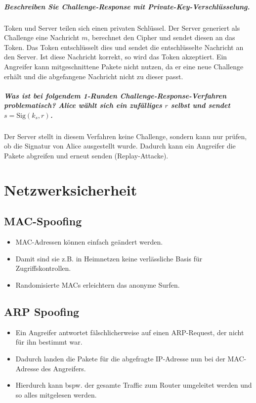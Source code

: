 \documentclass[a4paper, 11pt, accentcolor = tud3b]{tudreport}
\newcommand{\Sig}{\ensuremath{\textrm{Sig}}}
\begin{document}
			\paragraph{Beschreiben Sie Challenge-Response mit Private-Key-Verschlüsselung.}
			Token und Server teilen sich einen privaten Schlüssel. Der Server generiert als Challenge eine Nachricht \(m\), berechnet den Cipher und sendet diesen an das Token. Das Token entschlüsselt dies und sendet die entschlüsselte Nachricht an den Server. Ist diese Nachricht korrekt, so wird das Token akzeptiert. Ein Angreifer kann mitgeschnittene Pakete nicht nutzen, da er eine neue Challenge erhält und die abgefangene Nachricht nicht zu dieser passt.
			
			\paragraph{Was ist bei folgendem 1-Runden Challenge-Response-Verfahren problematisch? Alice wählt sich ein zufälliges \(r\) selbst und sendet \(s = \Sig(k_s, r)\).}
			Der Server stellt in diesem Verfahren keine Challenge, sondern kann nur prüfen, ob die Signatur von Alice ausgestellt wurde. Dadurch kann ein Angreifer die Pakete abgreifen und erneut senden (Replay-Attacke).

    \chapter{Netzwerksicherheit}
	    \label{c:networksecurity}
    
        \section{MAC-Spoofing}
            \begin{itemize}
            	\item MAC-Adressen können einfach geändert werden.
            	\item Damit sind sie z.B. in Heimnetzen keine verlässliche Basis für Zugriffskontrollen.
            	\item Randomisierte MACs erleichtern das anonyme Surfen.
            \end{itemize}

        \section{ARP Spoofing}
            \begin{itemize}
            	\item Ein Angreifer antwortet fälschlicherweise auf einen ARP-Request, der nicht für ihn bestimmt war.
            	\item Dadurch landen die Pakete für die abgefragte IP-Adresse nun bei der MAC-Adresse des Angreifers.
            	\item Hierdurch kann bspw. der gesamte Traffic zum Router umgeleitet werden und so alles mitgelesen werden.
            \end{itemize}
        
\end{document}
